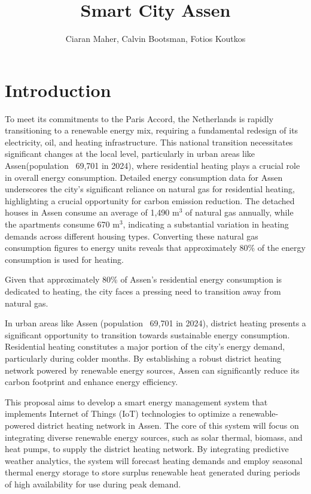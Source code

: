 \documentclass[conference]{IEEEtran}
\title{Smart City Assen}
\author{Ciaran Maher, Calvin Bootsman, Fotios Koutkos}
\begin{document}
\maketitle
\section{Introduction}
To meet its commitments to the Paris Accord, the Netherlands is rapidly transitioning to a renewable energy mix, requiring a fundamental redesign of its electricity, oil, and heating infrastructure\cite{paris_agreement}. This national transition necessitates significant changes at the local level, particularly in urban areas like Assen(population ~69,701 in 2024\cite{allecijfers}), where residential heating plays a crucial role in overall energy consumption. Detailed energy consumption data for Assen underscores the city's significant reliance on natural gas for residential heating, highlighting a crucial opportunity for carbon emission reduction. The detached houses in Assen consume an average of 1,490 m$^3$ of natural gas annually, while the apartments consume 670 m$^3$\cite{assen_woningen}, indicating a substantial variation in heating demands across different housing types. Converting these natural gas consumption figures to energy units reveals that approximately 80\% of the energy consumption is used for heating.

Given that approximately 80\% of Assen's residential energy consumption is dedicated to heating, the city faces a pressing need to transition away from natural gas. 

In urban areas like Assen (population ~69,701 in 2024\cite{allecijfers}), district heating presents a significant opportunity to transition towards sustainable energy consumption. Residential heating constitutes a major portion of the city's energy demand, particularly during colder months. By establishing a robust district heating network powered by renewable energy sources, Assen can significantly reduce its carbon footprint and enhance energy efficiency\cite{allecijfers}.

This proposal aims to develop a smart energy management system that implements Internet of Things (IoT) technologies to optimize a renewable-powered district heating network in Assen. The core of this system will focus on integrating diverse renewable energy sources, such as solar thermal, biomass, and heat pumps, to supply the district heating network. By integrating predictive weather analytics, the system will forecast heating demands and employ seasonal thermal energy storage to store surplus renewable heat generated during periods of high availability for use during peak demand.
\end{document}
